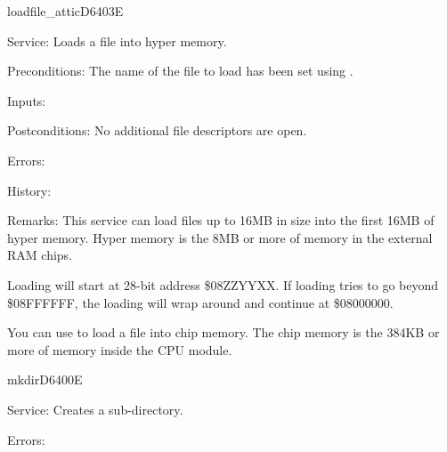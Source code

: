 \newpage
\begin{hyppotrap}{loadfile\_attic}{D640}{3E}
\item [Service:]
  Loads a file into hyper memory.
\item [Preconditions:]
  The name of the file to load has been set using .
\item [Inputs:]
\item [Postconditions:]
  No additional file descriptors are open.
\item [Errors:]
\item [History:]
\item [Remarks:]
  This service can load files up to 16MB in size into the first 16MB of hyper
  memory. Hyper memory is the 8MB or more of memory in the external RAM chips.

  Loading will start at 28-bit address \$08ZZYYXX. If loading tries to go beyond
  \$08FFFFFF, the loading will wrap around and continue at \$08000000.

  You can use  to load a file into chip memory. The chip
  memory is the 384KB or more of memory inside the CPU module.
\end{hyppotrap}


\newpage
\begin{hyppotrap}{mkdir}{D640}{0E}
\item [Service:]
  Creates a sub-directory.
\item [Errors:]
\notimplemented
\end{hyppotrap}


